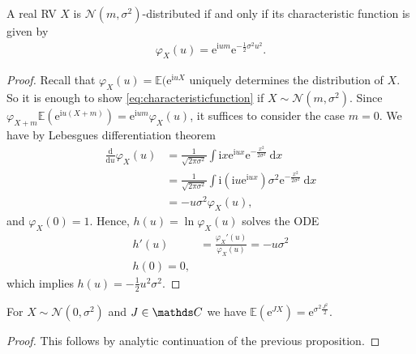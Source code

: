 \begin{prop}
A real RV $X$ is $\mathcal{N}(m,\sigma^2)$-distributed if and only if
its characteristic function is given by
\begin{align}\label{eq:characteristicfunction}
\varphi_X(u)=\mathrm{e}^{\mathrm{i}um}\mathrm{e}^{-\frac{1}{2}\sigma^2u^2}.
\end{align}
\begin{proof}
Recall that $\varphi_X(u)=\mathds{E}(\mathrm{e}^{\mathrm{i}uX}$ uniquely determines the distribution of $X$.
So it is enough to show \eqref{eq:characteristicfunction} if
$X\sim \mathcal{N}(m,\sigma^2)$.
Since $\varphi_{X+m}\mathds{E} \left(\mathrm{e}^{\mathrm{i}u(X+m)}\right)=\mathrm{e}^{\mathrm{i}um}\varphi_X(u)$,
it suffices to consider the case $m=0$. We have by Lebesgues differentiation theorem
\begin{align*}
\frac{\mathrm{d}}{\mathrm{d}u}\varphi_X(u)&=\frac{1}{\sqrt{2\pi \sigma^2}} \int \mathrm{i}x\mathrm{e}^{\mathrm{i}ux}\mathrm{e}^{-\frac{x^2}{2 \sigma^2}}~\mathrm{d}x\\
&=\frac{1}{\sqrt{2 \pi \sigma^2}} \int \mathrm{i}(\mathrm{i}u \mathrm{e}^{\mathrm{i}ux})\sigma^2 \mathrm{e}^{-\frac{x^2}{2 \sigma^2}}~\mathrm{d}x\\
&=-u \sigma^2 \varphi_X(u),
\end{align*}
and $\varphi_X(0)=1$. Hence, $h(u)=\ln \varphi_X(u)$ solves the ODE
\begin{align*}
h'(u)&=\frac{\varphi_X'(u)}{\varphi_X(u)}=-u \sigma^2\\
h(0)=0,
\end{align*}
which implies $h(u)=-\frac{1}{2}u^2\sigma^2$.
\end{proof}
\end{prop}

\begin{cor}
For $X \sim \mathcal{N}(0,\sigma^2)$ and $J\in \C$ we have $\mathds{E}\left(\mathrm{e}^{JX}\right)=\mathrm{e}^{\sigma^2 \frac{J^2}{2}}$.
\begin{proof}
This follows by analytic continuation of the previous proposition.
\end{proof}
\end{cor}

